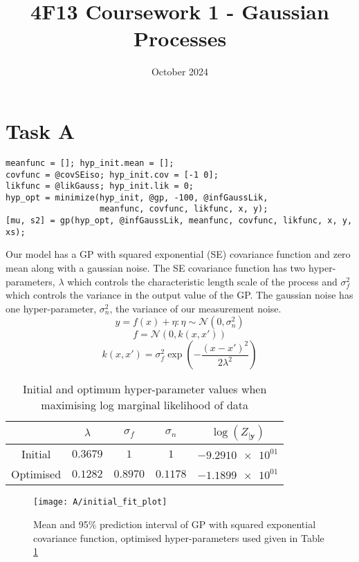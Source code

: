 \documentclass[11pt]{article}
\title{\vspace{-2cm}4F13 Coursework 1 - Gaussian Processes}
\author{}
\date{October 2024}
\begin{document}
\maketitle
\section{Task A}

\begin{lstlisting}[caption=Code to train hyper-parameters and generate the predictive distribution of a GP with squared exponential covariance, captionpos=b, basicstyle=\small]
meanfunc = []; hyp_init.mean = [];
covfunc = @covSEiso; hyp_init.cov = [-1 0];
likfunc = @likGauss; hyp_init.lik = 0;
hyp_opt = minimize(hyp_init, @gp, -100, @infGaussLik, 
                   meanfunc, covfunc, likfunc, x, y);
[mu, s2] = gp(hyp_opt, @infGaussLik, meanfunc, covfunc, likfunc, x, y, xs);
\end{lstlisting}


Our model has a GP with squared exponential (SE) covariance function and zero mean along with a gaussian noise. The SE covariance function has two hyper-parameters, $\lambda$ which controls the characteristic length scale of the process and $\sigma_f^2$ which controls the variance in the output value of the GP. The gaussian noise has one hyper-parameter, $\sigma_n^2$, the variance of our measurement noise. 
\[y = f(x) + \eta : \eta \sim \mathcal{N}(0, \sigma_n^2)\]
\[f = \mathcal{N}(0, k(x, x'))\]
\[k(x,x') = \sigma_f^2 \exp(-\frac{(x-x')^2}{2\lambda^2})\]

\begin{table}[h]
    \centering
    \begin{tabular}{|c|c|c|c|c|}
        \hline
         & $\lambda$ & $\sigma_f$ & $\sigma_n$ & $\log(Z_{|\textbf{y}})$ \\
        \hline
        Initial & $0.3679$ & $1$ & $1$ & $\num{-9.2910e+01}$ \\ 
        Optimised & $0.1282$ & $0.8970$ & $0.1178$ & $\num{-1.1899e+01}$ \\ 
        \hline
    \end{tabular}
    \caption{Initial and optimum hyper-parameter values when maximising log marginal likelihood of data}
    \label{table:A_hyper_parameters}
\end{table}

\begin{figure}[h]
    \centering
    \texttt{[image: A/initial\_fit\_plot]}
    \caption{Mean and 95\% prediction interval of GP with squared exponential covariance function, optimised hyper-parameters used given in Table \ref{table:A_hyper_parameters}}
    \label{fig:A}
\end{figure}
\end{document}
